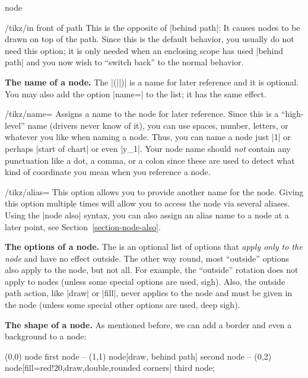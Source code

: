 \begin{pathoperation}{node}
    \begin{key}{/tikz/in front of path}
        This is the opposite of |behind path|: It causes nodes to be drawn on
        top of the path. Since this is the default behavior, you usually do
        not need this option; it is only needed when an enclosing scope has
        used |behind path| and you now wish to ``switch back'' to the normal
        behavior.
    \end{key}

    \medskip
    \textbf{The name of a node.}
    The |(||)| is a name for later reference and it is optional. You
    may also add the option |name=| to the  list; it
    has the same effect.

    \begin{key}{/tikz/name=}
        Assigns a name to the node for later reference. Since this is a
        ``high-level'' name (drivers never know of it), you can use spaces,
        number, letters, or whatever you like when naming a node. Thus, you can
        name a node just |1| or perhaps |start of chart| or even |y_1|. Your
        node name should \emph{not} contain any punctuation like a dot, a
        comma, or a colon since these are used to detect what kind of
        coordinate you mean when you reference a node.
    \end{key}

    \begin{key}{/tikz/alias=}
        This option allows you to provide another name for the node. Giving
        this option multiple times will allow you to access the node via
        several aliases. Using the |node also| syntax, you can also assign an
        alias name to a node at a later point, see
        Section~\ref{section-node-also}.
    \end{key}

    \medskip
    \textbf{The options of a node.}
    The  is an optional list of options that \emph{apply only to
    the node} and have no effect outside. The other way round, most ``outside''
    options also apply to the node, but not all. For example, the ``outside''
    rotation does not apply to nodes (unless some special options are used,
    sigh). Also, the outside path action, like |draw| or |fill|, never applies
    to the node and must be given in the node (unless some special other
    options are used, deep sigh).

    \medskip
    \textbf{The shape of a node.}
    As mentioned before, we can add a border and even a background to a node:
\begin{codeexample}[]
\tikz \fill[fill=yellow!80!black]
      (0,0) node {first node}
   -- (1,1) node[draw, behind path] {second node}
   -- (0,2) node[fill=red!20,draw,double,rounded corners] {third node};
\end{codeexample}


\end{pathoperation}

